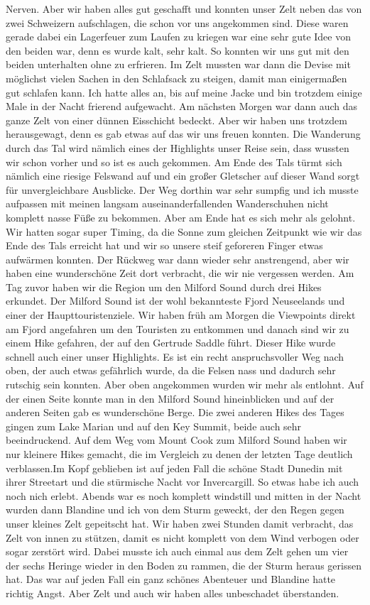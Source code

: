 \documentclass[11pt]{book}
\begin{document}
Nerven. Aber wir haben alles gut geschafft und konnten unser Zelt neben das von zwei Schweizern aufschlagen, die schon vor uns angekommen sind. 
Diese waren gerade dabei ein Lagerfeuer zum Laufen zu kriegen war eine sehr gute Idee von den beiden war, denn es wurde kalt, sehr kalt. 
So konnten wir uns gut mit den beiden unterhalten ohne zu erfrieren. Im Zelt mussten war dann die Devise mit möglichst vielen Sachen 
in den Schlafsack zu steigen, damit man einigermaßen gut schlafen kann. Ich hatte alles an, bis auf meine Jacke und bin trotzdem einige 
Male in der Nacht frierend aufgewacht. Am nächsten Morgen war dann auch das ganze Zelt von einer dünnen Eisschicht bedeckt. Aber wir 
haben uns trotzdem herausgewagt, denn es gab etwas auf das wir uns freuen konnten. Die Wanderung durch das Tal wird nämlich eines 
der Highlights unser Reise sein, dass wussten wir schon vorher und so ist es auch gekommen. Am Ende des Tals türmt sich nämlich 
eine riesige Felswand auf und ein großer Gletscher auf dieser Wand sorgt für unvergleichbare Ausblicke. Der Weg dorthin war sehr 
sumpfig und ich musste aufpassen mit meinen langsam auseinanderfallenden Wanderschuhen nicht komplett nasse Füße zu bekommen. 
Aber am Ende hat es sich mehr als gelohnt. Wir hatten sogar super Timing, da die Sonne zum gleichen Zeitpunkt wie wir das Ende 
des Tals erreicht hat und wir so unsere steif geforeren Finger etwas aufwärmen konnten. Der Rückweg war dann wieder sehr anstrengend, 
aber wir haben eine wunderschöne Zeit dort verbracht, die wir nie vergessen werden. 
Am Tag zuvor haben wir die Region um den Milford Sound durch drei Hikes erkundet. Der Milford Sound ist der wohl bekannteste Fjord 
Neuseelands und einer der Haupttouristenziele. Wir haben früh am Morgen die Viewpoints direkt am Fjord angefahren um den Touristen 
zu entkommen und danach sind wir zu einem Hike gefahren, der auf den Gertrude Saddle führt. Dieser Hike wurde schnell auch einer unser 
Highlights. Es ist ein recht anspruchsvoller Weg nach oben, der auch etwas gefährlich wurde, da die Felsen nass und dadurch sehr 
rutschig sein konnten. Aber oben angekommen wurden wir mehr als entlohnt. Auf der einen Seite konnte man in den Milford Sound hineinblicken 
und auf der anderen Seiten gab es wunderschöne Berge. Die zwei anderen Hikes des Tages gingen zum Lake Marian und auf den Key Summit, beide 
auch sehr beeindruckend. 
Auf dem Weg vom Mount Cook zum Milford Sound haben wir nur kleinere Hikes gemacht, die im Vergleich zu denen der letzten Tage 
deutlich verblassen.Im Kopf geblieben ist auf jeden Fall die schöne Stadt Dunedin mit ihrer Streetart und die stürmische Nacht vor Invercargill. 
So etwas habe ich auch noch nich erlebt. Abends war es noch komplett windstill und mitten in der Nacht wurden dann Blandine und 
ich von dem Sturm geweckt, der den Regen gegen unser kleines Zelt gepeitscht hat. Wir haben zwei Stunden damit verbracht, das Zelt 
von innen zu stützen, damit es nicht komplett von dem Wind verbogen oder sogar zerstört wird. Dabei musste ich auch einmal aus dem Zelt 
gehen um vier der sechs Heringe wieder in den Boden zu rammen, die der Sturm heraus gerissen hat. Das war auf jeden Fall ein ganz 
schönes Abenteuer und Blandine hatte richtig Angst. Aber Zelt und auch wir haben alles unbeschadet überstanden. 
\end{document}
